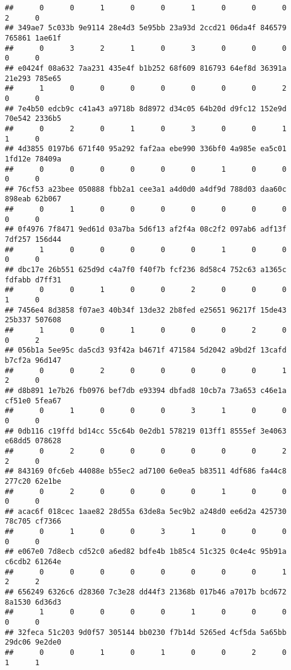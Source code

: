 \documentclass[
]{article}
\begin{document}
\begin{verbatim}
##      0      0      1      0      0      1      0      0      0      2      0 
## 349ae7 5c033b 9e9114 28e4d3 5e95bb 23a93d 2ccd21 06da4f 846579 765861 1ae61f 
##      0      3      2      1      0      3      0      0      0      0      0 
## e0424f 08a632 7aa231 435e4f b1b252 68f609 816793 64ef8d 36391a 21e293 785e65 
##      1      0      0      0      0      0      0      0      2      0      0 
## 7e4b50 edcb9c c41a43 a9718b 8d8972 d34c05 64b20d d9fc12 152e9d 70e542 2336b5 
##      0      2      0      1      0      3      0      0      1      1      0 
## 4d3855 0197b6 671f40 95a292 faf2aa ebe990 336bf0 4a985e ea5c01 1fd12e 78409a 
##      0      0      0      0      0      0      1      0      0      0      0 
## 76cf53 a23bee 050888 fbb2a1 cee3a1 a4d0d0 a4df9d 788d03 daa60c 898eab 62b067 
##      0      1      0      0      0      0      0      0      0      0      0 
## 0f4976 7f8471 9ed61d 03a7ba 5d6f13 af2f4a 08c2f2 097ab6 adf13f 7df257 156d44 
##      1      0      0      0      0      0      1      0      0      0      0 
## dbc17e 26b551 625d9d c4a7f0 f40f7b fcf236 8d58c4 752c63 a1365c fdfabb d7ff31 
##      0      0      1      0      0      2      0      0      0      1      0 
## 7456e4 8d3858 f07ae3 40b34f 13de32 2b8fed e25651 96217f 15de43 25b337 507608 
##      1      0      0      1      0      0      0      2      0      0      2 
## 056b1a 5ee95c da5cd3 93f42a b4671f 471584 5d2042 a9bd2f 13cafd b7cf2a 96d147 
##      0      0      2      0      0      0      0      0      1      2      0 
## d8b891 1e7b26 fb0976 bef7db e93394 dbfad8 10cb7a 73a653 c46e1a cf51e0 5fea67 
##      0      1      0      0      0      3      1      0      0      0      0 
## 0db116 c19ffd bd14cc 55c64b 0e2db1 578219 013ff1 8555ef 3e4063 e68dd5 078628 
##      0      2      0      0      0      0      0      0      2      2      0 
## 843169 0fc6eb 44088e b55ec2 ad7100 6e0ea5 b83511 4df686 fa44c8 277c20 62e1be 
##      0      2      0      0      0      0      1      0      0      0      0 
## acac6f 018cec 1aae82 28d55a 63de8a 5ec9b2 a248d0 ee6d2a 425730 78c705 cf7366 
##      0      1      0      0      3      1      0      0      0      0      0 
## e067e0 7d8ecb cd52c0 a6ed82 bdfe4b 1b85c4 51c325 0c4e4c 95b91a c6cdb2 61264e 
##      0      0      0      0      0      0      0      0      1      2      2 
## 656249 6326c6 d28360 7c3e28 dd44f3 21368b 017b46 a7017b bcd672 8a1530 6d36d3 
##      1      0      0      0      0      1      0      0      0      0      0 
## 32feca 51c203 9d0f57 305144 bb0230 f7b14d 5265ed 4cf5da 5a65bb 29dc06 9e2de0 
##      0      0      1      0      1      0      0      2      0      1      1 

\end{verbatim}
\end{document}
